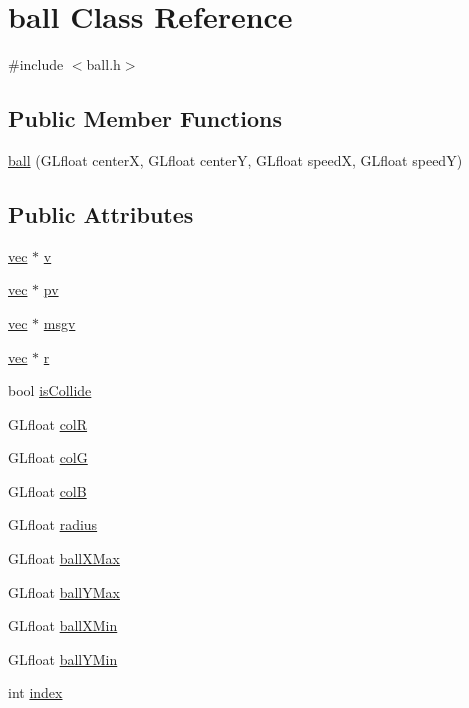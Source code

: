 \hypertarget{classball}{\section{ball Class Reference}
\label{classball}
}


{\ttfamily \#include $<$ball.\-h$>$}

\subsection*{Public Member Functions}
\begin{DoxyCompactItemize}
\item 
\hyperlink{classball_a6a293eb72008fe17d8eacada1478af0d}{ball} (G\-Lfloat center\-X, G\-Lfloat center\-Y, G\-Lfloat speed\-X, G\-Lfloat speed\-Y)
\end{DoxyCompactItemize}
\subsection*{Public Attributes}
\begin{DoxyCompactItemize}
\item 
\hyperlink{classvec}{vec} $\ast$ \hyperlink{classball_a8adef25d2f27628485033939eae67eec}{v}
\item 
\hyperlink{classvec}{vec} $\ast$ \hyperlink{classball_a2b5d471b7ec44b996768d65ea42ef03d}{pv}
\item 
\hyperlink{classvec}{vec} $\ast$ \hyperlink{classball_ad41479311c03864d76c8299de3ef0903}{msgv}
\item 
\hyperlink{classvec}{vec} $\ast$ \hyperlink{classball_ab0d2efebfce310a14baae187068f8cba}{r}
\item 
bool \hyperlink{classball_a4402bbec17da12c4d734a9db9319cb16}{is\-Collide}
\item 
G\-Lfloat \hyperlink{classball_a11052008f4d4bd433bdc3b94d78a046c}{col\-R}
\item 
G\-Lfloat \hyperlink{classball_ad5879b3b24b32224de452fbd4eef9944}{col\-G}
\item 
G\-Lfloat \hyperlink{classball_a9084a7be3eec66abdc6f76bbc2f97d1c}{col\-B}
\item 
G\-Lfloat \hyperlink{classball_aba87b3175abb51815ac38f21902195d2}{radius}
\item 
G\-Lfloat \hyperlink{classball_a5c8547e78a72e0fd0ab48ea8b9afa2ab}{ball\-X\-Max}
\item 
G\-Lfloat \hyperlink{classball_ae35c5b58dc2c8683a7f89c7ff71c55d8}{ball\-Y\-Max}
\item 
G\-Lfloat \hyperlink{classball_a52ad45fd0de8488d56fb32149038b261}{ball\-X\-Min}
\item 
G\-Lfloat \hyperlink{classball_a22d4a2799b1ac4abfd5fe61e28dddfd1}{ball\-Y\-Min}
\item 
int \hyperlink{classball_ae162ad4b3909dba27f9b6647af8d3610}{index}
\end{DoxyCompactItemize}


